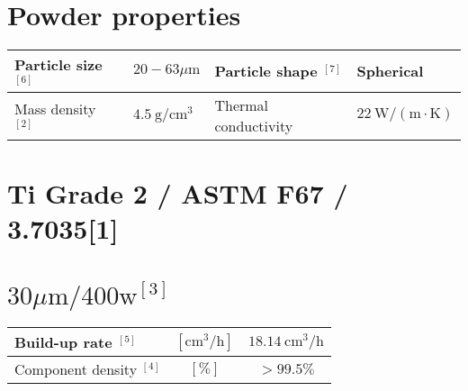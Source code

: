 \documentclass[10pt]{article}
\begin{document}
\section*{Powder properties}
\begin{center}
\begin{tabular}{|l|l|l|l|}
\hline
Particle size ${ }^{[6]}$ & $20-63 \mu \mathrm{m}$ & Particle shape ${ }^{[7]}$ & Spherical \\
\hline
Mass density ${ }^{[2]}$ & $4.5 \mathrm{~g} / \mathrm{cm}^{3}$ & Thermal conductivity & $22 \mathrm{~W} /(\mathrm{m} \cdot \mathrm{K})$ \\
\hline
\end{tabular}
\end{center}

\section*{Ti Grade 2 / ASTM F67 / 3.7035[1]}
\section*{$30 \mu \mathrm{m} / 400 \mathrm{w}^{[3]}$}
\begin{center}
\begin{tabular}{|l|c|c|}
\hline
Build-up rate ${ }^{[5]}$ & $\left[\mathrm{cm}^{3} / \mathrm{h}\right]$ & $18.14 \mathrm{~cm}^{3} / \mathrm{h}$ \\
\hline
Component density $^{[4]}$ & $[\%]$ & $>99.5 \%$ \\
\hline
\end{tabular}
\end{center}
\end{document}
